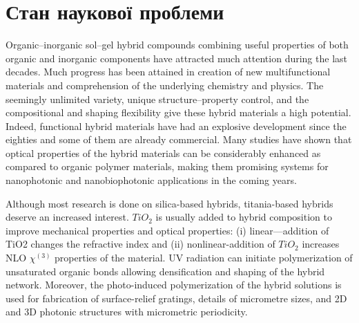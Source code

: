 \newpage
\chapter{Стан наукової проблеми}


Organic–inorganic sol–gel hybrid compounds combining useful properties of both organic and inorganic components have attracted much attention during the last decades. Much progress has been attained in creation of new multifunctional materials and comprehension of the underlying chemistry and physics. The seemingly unlimited variety, unique structure–property control, and the compositional and shaping flexibility give these hybrid materials a high potential. Indeed, functional hybrid materials have had an explosive development since the eighties and some of them are already commercial. Many studies have shown that optical properties of the hybrid materials can be considerably enhanced as compared to organic polymer materials, making them promising systems for nanophotonic and nanobiophotonic applications in the coming years.

Although most research is done on silica-based hybrids, titania-based hybrids deserve an increased interest. $TiO_2$ is usually added to hybrid composition to improve mechanical properties and optical properties: (i) linear—addition of TiO2 changes the refractive index and (ii) nonlinear-addition of $TiO_2$ increases NLO $\chi^{(3)}$ properties of the material. UV radiation can initiate polymerization of unsaturated organic bonds allowing densification and shaping of the hybrid network. Moreover, the photo-induced polymerization of the hybrid solutions is used for fabrication of surface-relief gratings, details of micrometre sizes, and 2D and 3D photonic structures with micrometric periodicity.

